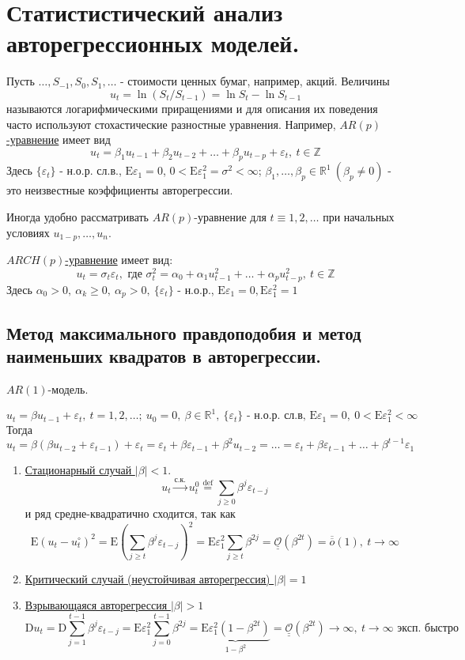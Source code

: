 \documentclass[12pt]{article}
\theoremstyle{basic_theorem}
\newcommand*{\defeq}{\stackrel{\text{def}}{=}}
\def\eps{ \varepsilon }
\def\R{ \mathbb{R} }
\def\Z{ \mathbb{Z} }
\def\E{ \mathrm{E} }
\def\D{ \mathrm{D} }
\def\littleO{ \overline{\overline{o}} }
\def\bigO{ \underline{\underline{\mathcal{O}}} }
\begin{document}
\tableofcontents

\newpage





\section{Статистистический анализ авторегрессионных моделей.}

Пусть $\ldots,S_{-1},S_0,S_1,\ldots$ - стоимости ценных бумаг, например, акций.
Величины 
\[u_t=\ln(S_t/S_{t-1})=\ln S_t-\ln S_{t-1}\]
называются логарифмическими приращениями и для описания
их поведения часто используют стохастические разностные
уравнения. Например, \underline{$AR(p)$-уравнение} имеет вид
\[u_t=\beta_1u_{t-1}+\beta_2u_{t-2}+\ldots+\beta_pu_{t-p}+\eps_t,\ t\in\Z\]
Здесь $\{\eps_t\}$ - н.о.р. сл.в., $\E\eps_1=0$, $0<\E\eps_1^2=\sigma^2<\infty$; $\beta_1,\ldots,\beta_p\in\R^1\ (\beta_p\neq0)$ - 
это неизвестные коэффициенты авторегрессии.

Иногда удобно рассматривать $AR(p)$-уравнение для $t\equiv1,2,\ldots$ при начальных условиях
$u_{1-p},\ldots,u_n$.

\underline{$ARCH(p)$-уравнение} имеет вид:
\[u_t=\sigma_t\eps_t,\text{ где } \sigma_t^2=\alpha_0+\alpha_1u_{t-1}^2+\ldots+\alpha_pu_{t-p}^2,\ t\in\Z\]
Здесь $\alpha_0>0,\ \alpha_k\geq0,\ \alpha_p>0,\ \{\eps_t\}$ - н.о.р., $\E\eps_1=0,\E\eps_1^2=1$

\subsection{Метод максимального правдоподобия и метод наименьших квадратов в авторегрессии.}

$AR(1)$-модель.

\begin{equation}\label{def::ar_model}
    u_t=\beta u_{t-1}+\eps_t,\ t=1,2,\ldots;\ u_0=0,\ \beta\in\R^1,\ \{\eps_t\}\text{ - н.о.р. сл.в, }\E\eps_1=0,\ 0<\E\eps_1^2<\infty 
\end{equation}
Тогда
\[u_t=\beta(\beta u_{t-2}+\eps_{t-1})+\eps_t=\eps_t+\beta\eps_{t-1}+\beta^2u_{t-2}=\ldots=\eps_t+\beta\eps_{t-1}+\ldots+\beta^{t-1}\eps_1\]
\begin{enumerate}
    \item \underline{Стационарный случай $|\beta|<1$}.
    \[u_t\xrightarrow{\mbox{с.к.}}u_t^0\defeq\sum_{j\geq0}\beta^j\eps_{t-j}\]
    и ряд средне-квадратично сходится, так как
    \[\E(u_t-u_t^\circ)^2=\E(\sum_{j\geq t}\beta^j\eps_{t-j})^2=\E\eps_1^2\sum_{j\geq t}\beta^{2j}=\bigO(\beta^{2t})=\littleO(1),\ t\rightarrow\infty\]
    \item \underline{Критический случай (неустойчивая авторегрессия) $|\beta|=1$}
    \item \underline{Взрывающаяся авторегрессия $|\beta|>1$}
    \[\D u_t=\D\sum_{j=1}^{t-1}\beta^j\eps_{t-j}=\E\eps^2_1\sum_{j=0}^{t-1}\beta^{2j}=\underbrace{\E\eps_1^2(1-\beta^{2t})}_{1-\beta^2}=\bigO(\beta^{2t})\rightarrow\infty,\ t\rightarrow\infty\text{ эксп. быстро}\]
\end{enumerate}
\end{document}
